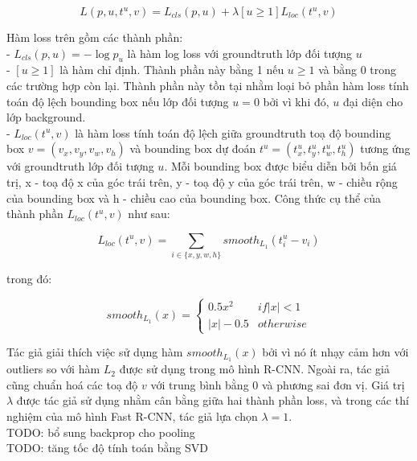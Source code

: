 {    \begin{equation}
        \label{eq:fast_rcnn_loss}
        L(p, u, t^u, v) = L_{cls}(p, u) + \lambda [u \ge 1] L_{loc}(t^u, v)
    \end{equation}

    \noindent
    Hàm loss trên gồm các thành phần: \\
    -  $L_{cls}(p, u) = -\log p_u$ là hàm log loss với groundtruth lớp đối tượng $u$ \\
    -  $[u \ge 1]$ là hàm chỉ định. Thành phần này bằng 1 nếu $u \ge 1$ và bằng 0 trong các trường hợp còn lại. Thành phần này tồn tại nhằm loại bỏ phần hàm loss tính toán độ lệch bounding box nếu lớp đối tượng $u = 0$ bởi vì khi đó, $u$ đại diện cho lớp background. \\
    -  $L_{loc}(t^u, v)$ là hàm loss tính toán độ lệch giữa groundtruth toạ độ bounding box $v = (v_{x}, v_{y}, v_{w}, v_{h})$ và bounding box dự đoán $t^u = (t^u_{x}, t^u_{y}, t^u_{w}, t^u_{h})$ tương ứng với groundtruth lớp đối tượng $u$. Mỗi bounding box được biểu diễn bởi bốn giá trị, x - toạ độ x của góc trái trên, y - toạ độ y của góc trái trên, w - chiều rộng của bounding box và h - chiều cao của bounding box.
    Công thức cụ thể của thành phần $L_{loc}(t^u, v)$ như sau:

    \begin{equation}
        \label{eq:fast_rcnn_bb_loss}
        L_{loc}(t^u, v) = \sum_{i \in \{{x},{y},{w},{h}\}} {smooth}_{L_1}(t^u_i - v_i)
    \end{equation}

    \noindent
    trong đó:

    \begin{equation}
        \label{eq:fast_rcnn_bb_loss_l1}
        {smooth}_{L_1}(x) =
        \begin{cases}
            0.5x^2& {if} |x| < 1 \\
            |x| - 0.5& {otherwise}
        \end{cases}
    \end{equation}

    \noindent
    Tác giả giải thích việc sử dụng hàm ${smooth}_{L_1}(x)$ bởi vì nó ít nhạy cảm hơn với outliers so với hàm ${L_2}$ được sử dụng trong mô hình R-CNN.
    Ngoài ra, tác giả cũng chuẩn hoá các toạ độ $v$ với trung bình bằng 0 và phương sai đơn vị.
    Giá trị $\lambda$ được tác giả sử dụng nhằm cân bằng giữa hai thành phần loss, và trong các thí nghiệm của mô hình Fast R-CNN, tác giả lựa chọn $\lambda = 1$. \\
    TODO: bổ sung backprop cho pooling \\
    TODO: tăng tốc độ tính toán bằng SVD

}
